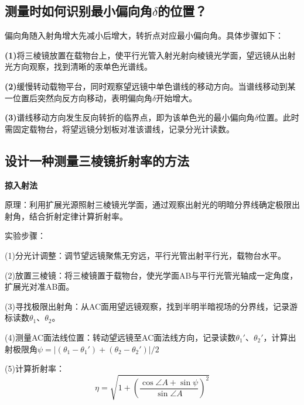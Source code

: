 \documentclass[]{../template/Report}%
\begin{document}
\begin{fullreportonly}
\subsection{测量时如何识别最小偏向角$\delta$的位置？}
偏向角随入射角增大先减小后增大，转折点对应最小偏向角。具体步骤如下：
\par
\textbf{(1)}将三棱镜放置在载物台上，使平行光管入射光射向棱镜光学面，望远镜从出射光方向观察，找到清晰的汞单色光谱线。
\par
\textbf{(2)}缓慢转动载物平台，同时观察望远镜中单色谱线的移动方向。当谱线移动到某一位置后突然向反方向移动，表明偏向角$\delta$开始增大。
\par
\textbf{(3)}谱线移动方向发生反向转折的临界点，即为该单色光的最小偏向角$\delta$位置。此时需固定载物台，将望远镜分划板对准该谱线，记录分光计读数。
\subsection{设计一种测量三棱镜折射率的方法}
\textbf{掠入射法}
\par
原理：利用扩展光源照射三棱镜光学面，通过观察出射光的明暗分界线确定极限出射角，结合折射定律计算折射率。
\par
实验步骤：
\par
(1)分光计调整：调节望远镜聚焦无穷远，平行光管出射平行光，载物台水平。
\par
(2)放置三棱镜：将三棱镜置于载物台，使光学面AB与平行光管光轴成一定角度，扩展光对准AB面。
\par
(3)寻找极限出射角：从AC面用望远镜观察，找到半明半暗视场的分界线，记录游标读数$\theta_1、\theta_2$。
\par
(4)测量AC面法线位置：转动望远镜至AC面法线方向，记录读数$\theta_1'$、$\theta_2'$，计算出射极限角$\psi = |(\theta_1 - \theta_1') + (\theta_2 - \theta_2')|/2$
\par
(5)计算折射率：
\[
    \eta = \sqrt{1 + (\frac{\cos \angle A + \sin \psi }{\sin \angle A})^2} 
\]
\end{fullreportonly}
\insertnotes
\end{document}
